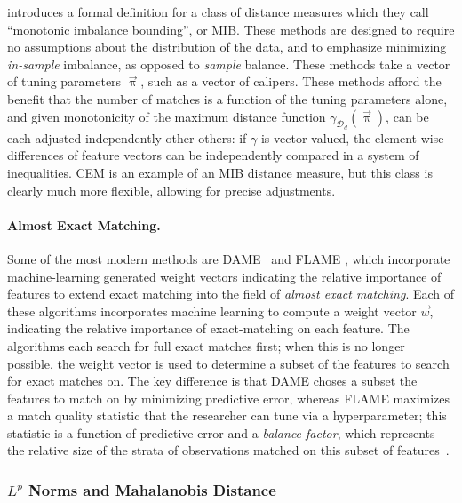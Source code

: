 \documentclass[11pt]{extarticle}
\begin{document}
\textcite{iacus_multivariate_2011} introduces a formal definition for a class of distance measures which they call ``monotonic imbalance bounding'', or MIB. These methods are designed to require no assumptions about the distribution of the data, and to emphasize minimizing \emph{in-sample} imbalance, as opposed to \emph{sample} balance. These methods take a vector of tuning parameters $\vec{\uppi}$, such as a vector of calipers. These methods afford the benefit that the number of matches is a function of the tuning parameters alone, and given monotonicity of the maximum distance function $\gamma_{\mathcal{D}_{d}}(\vec{\uppi})$, can be each adjusted independently other others: if $\gamma$ is vector-valued, the element-wise differences of feature vectors can be independently compared in a system of inequalities. CEM is an example of an MIB distance measure, but this class is clearly much more flexible, allowing for precise adjustments.

\paragraph{Almost Exact Matching.} Some of the most modern methods are DAME~\parencite{liu_interpretable_2019} and FLAME \cite{wang_flame_2021}, which incorporate machine-learning generated weight vectors indicating the relative importance of features to extend exact matching into the field of \emph{almost exact matching}. Each of these algorithms incorporates machine learning to compute a weight vector $\vec{w}$, indicating the relative importance of exact-matching on each feature. The algorithms each search for full exact matches first; when this is no longer possible, the weight vector is used to determine a subset of the features to search for exact matches on.
The key difference is that DAME choses a subset the features to match on by minimizing predictive error, whereas FLAME maximizes a match quality statistic that the researcher can tune via a hyperparameter; this statistic is a function of predictive error and a \emph{balance factor}, which represents the relative size of the strata of observations matched on this subset of features~\parencite{gupta_dame-flame_2021}.

\subsubsection{$L^p$ Norms and Mahalanobis Distance}
\label{subsubsec:normdist}
\end{document}
